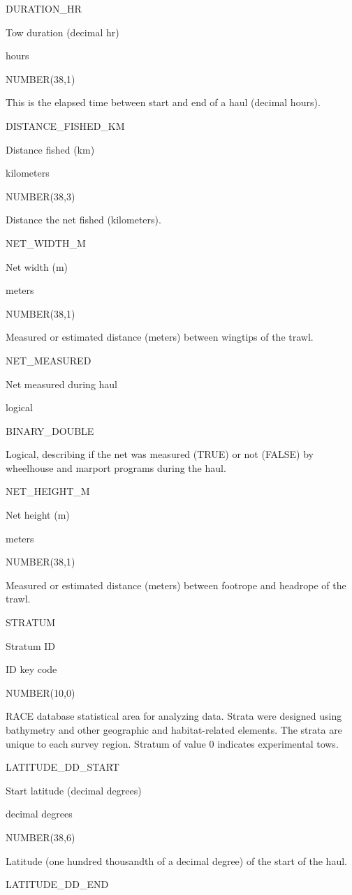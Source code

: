 \documentclass[
  letterpaper,
  oneside,
  open=any]{scrbook}
\begin{document}
DURATION\_HR

Tow duration (decimal hr)

hours

NUMBER(38,1)

This is the elapsed time between start and end of a haul (decimal
hours).

DISTANCE\_FISHED\_KM

Distance fished (km)

kilometers

NUMBER(38,3)

Distance the net fished (kilometers).

NET\_WIDTH\_M

Net width (m)

meters

NUMBER(38,1)

Measured or estimated distance (meters) between wingtips of the trawl.

NET\_MEASURED

Net measured during haul

logical

BINARY\_DOUBLE

Logical, describing if the net was measured (TRUE) or not (FALSE) by
wheelhouse and marport programs during the haul.

NET\_HEIGHT\_M

Net height (m)

meters

NUMBER(38,1)

Measured or estimated distance (meters) between footrope and headrope of
the trawl.

STRATUM

Stratum ID

ID key code

NUMBER(10,0)

RACE database statistical area for analyzing data. Strata were designed
using bathymetry and other geographic and habitat-related elements. The
strata are unique to each survey region. Stratum of value 0 indicates
experimental tows.

LATITUDE\_DD\_START

Start latitude (decimal degrees)

decimal degrees

NUMBER(38,6)

Latitude (one hundred thousandth of a decimal degree) of the start of
the haul.

LATITUDE\_DD\_END
\end{document}
